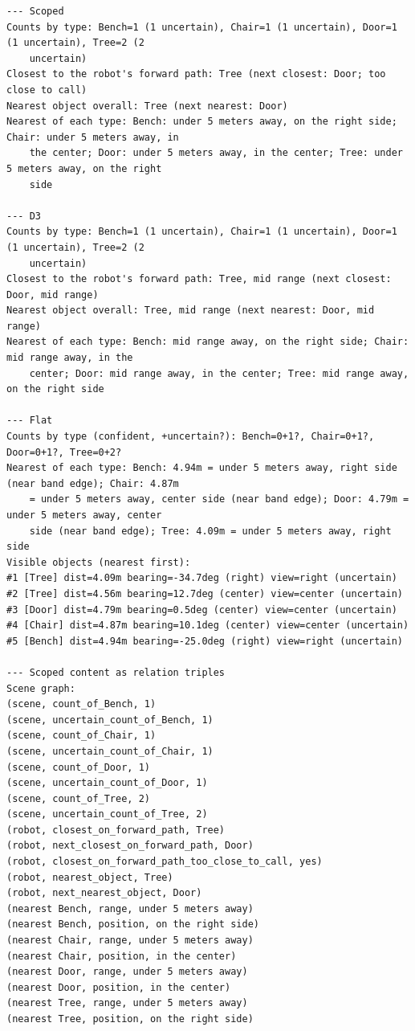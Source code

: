 \documentclass[10pt]{article}
\begin{document}
{\footnotesize
\begin{verbatim}
--- Scoped
Counts by type: Bench=1 (1 uncertain), Chair=1 (1 uncertain), Door=1 (1 uncertain), Tree=2 (2
    uncertain)
Closest to the robot's forward path: Tree (next closest: Door; too close to call)
Nearest object overall: Tree (next nearest: Door)
Nearest of each type: Bench: under 5 meters away, on the right side; Chair: under 5 meters away, in
    the center; Door: under 5 meters away, in the center; Tree: under 5 meters away, on the right
    side

--- D3
Counts by type: Bench=1 (1 uncertain), Chair=1 (1 uncertain), Door=1 (1 uncertain), Tree=2 (2
    uncertain)
Closest to the robot's forward path: Tree, mid range (next closest: Door, mid range)
Nearest object overall: Tree, mid range (next nearest: Door, mid range)
Nearest of each type: Bench: mid range away, on the right side; Chair: mid range away, in the
    center; Door: mid range away, in the center; Tree: mid range away, on the right side

--- Flat
Counts by type (confident, +uncertain?): Bench=0+1?, Chair=0+1?, Door=0+1?, Tree=0+2?
Nearest of each type: Bench: 4.94m = under 5 meters away, right side (near band edge); Chair: 4.87m
    = under 5 meters away, center side (near band edge); Door: 4.79m = under 5 meters away, center
    side (near band edge); Tree: 4.09m = under 5 meters away, right side
Visible objects (nearest first):
#1 [Tree] dist=4.09m bearing=-34.7deg (right) view=right (uncertain)
#2 [Tree] dist=4.56m bearing=12.7deg (center) view=center (uncertain)
#3 [Door] dist=4.79m bearing=0.5deg (center) view=center (uncertain)
#4 [Chair] dist=4.87m bearing=10.1deg (center) view=center (uncertain)
#5 [Bench] dist=4.94m bearing=-25.0deg (right) view=right (uncertain)

--- Scoped content as relation triples
Scene graph:
(scene, count_of_Bench, 1)
(scene, uncertain_count_of_Bench, 1)
(scene, count_of_Chair, 1)
(scene, uncertain_count_of_Chair, 1)
(scene, count_of_Door, 1)
(scene, uncertain_count_of_Door, 1)
(scene, count_of_Tree, 2)
(scene, uncertain_count_of_Tree, 2)
(robot, closest_on_forward_path, Tree)
(robot, next_closest_on_forward_path, Door)
(robot, closest_on_forward_path_too_close_to_call, yes)
(robot, nearest_object, Tree)
(robot, next_nearest_object, Door)
(nearest Bench, range, under 5 meters away)
(nearest Bench, position, on the right side)
(nearest Chair, range, under 5 meters away)
(nearest Chair, position, in the center)
(nearest Door, range, under 5 meters away)
(nearest Door, position, in the center)
(nearest Tree, range, under 5 meters away)
(nearest Tree, position, on the right side)


\end{verbatim}}
\end{document}
